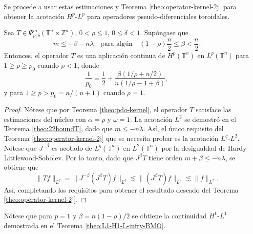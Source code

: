 Se procede a usar estas estimaciones y Teorema \ref{theo:operator-kernel-2j} para obtener la acotación $H^p$-$L^p$ para operadores pseudo-diferenciales toroidales. 
\begin{theorem}
	Sea $T\in \Psi^m_{\rho,\delta}(\mathbb{T}^n\times\mathbb{Z}^n)$, $0<\rho\leq1$, $0\leq\delta<1$. Supóngase que 
	\begin{equation*}
		m\leq-\beta-n\lambda \quad  \text{para algún} \quad (1-\rho)\frac{n}{2}\leq\beta< \frac{n}{2}.
	\end{equation*}
	Entonces, el operador $T$ es una aplicación continua de $H^p(\mathbb{T}^n)$ en $L^p(\mathbb{T}^n)$ para $1 \geq p \geq p_0$ cuando $\rho<1$, donde 
	\begin{equation}
		\frac{1}{p_0} = \frac{1}{2} + \frac{\beta(1/\rho + n/2)}{n(1/\rho-1+\beta)},
	\end{equation}
	y para $1\geq p > p_0=n/(n+1)$ cuando $\rho=1$.
	\label{theo:Hp-Lp}
\end{theorem}
\begin{proof}
	Nótese que por Teorema \ref{theo:pdo-kernel}, el operador $T$ satisface las estimaciones del núcleo con $\alpha=\rho$ y $\omega=1$. La acotación $L^2$ se demostró en el Teorema \ref{theo:22boundT}, dado que $m\leq -n\lambda$. Así, el único requisito del Teorema \ref{theo:operator-kernel-2j} que se necesita probar es la acotación $L^q$-$L^2$. Nótese que $J^{-\beta}$ es acotado de $L^q(\mathbb{T}^n)$ en $L^2(\mathbb{T}^n)$ por la desigualdad de Hardy-Littlewood-Sobolev. Por lo tanto, dado que $J^\beta T$ tiene orden $m+\beta \leq -n\lambda$, se obtiene que 
	\begin{equation}
		\|Tf\|_{L^q} =    \|J^{-\beta}(J^\beta T)f\|_{L^q} \lesssim \|(J^\beta T)f\|_{L^2} \lesssim \|f\|_{L^2}.
		\label{eq:q-2-boundedness}
	\end{equation}
	Así, completando los requisitos para obtener el resultado deseado del Teorema \ref{theo:operator-kernel-2j}.
\end{proof}
\begin{remark}
	Nótese que para $p=1$ y $\beta=n(1-\rho)/2$ se obtiene la continuidad $H^1$-$L^1$ demostrada en el Teorema \ref{theo:L1-H1-L-infty-BMO}.
	\end{remark}
